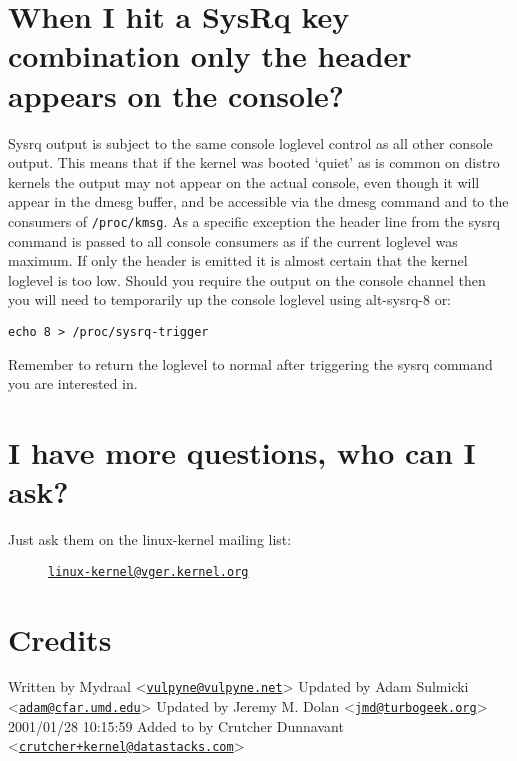 \documentclass[article,letterpaper]{memoir}
\let\subsection\section
\let\section\chapter
\begin{document}
\subsection{When I hit a SysRq key combination only the header appears
on the
console?}\label{when-i-hit-a-sysrq-key-combination-only-the-header-appears-on-the-console}

Sysrq output is subject to the same console loglevel control as all
other console output. This means that if the kernel was booted `quiet'
as is common on distro kernels the output may not appear on the actual
console, even though it will appear in the dmesg buffer, and be
accessible via the dmesg command and to the consumers of
\texttt{/proc/kmsg}. As a specific exception the header line from the
sysrq command is passed to all console consumers as if the current
loglevel was maximum. If only the header is emitted it is almost certain
that the kernel loglevel is too low. Should you require the output on
the console channel then you will need to temporarily up the console
loglevel using alt-sysrq-8 or:

\begin{verbatim}
echo 8 > /proc/sysrq-trigger
\end{verbatim}

Remember to return the loglevel to normal after triggering the sysrq
command you are interested in.

\subsection{I have more questions, who can I
ask?}\label{i-have-more-questions-who-can-i-ask}

\begin{description}
\item[Just ask them on the linux-kernel mailing list:]
\href{mailto:linux-kernel@vger.kernel.org}{\nolinkurl{linux-kernel@vger.kernel.org}}
\end{description}
\fi

\subsection{Credits}\label{credits}

Written by Mydraal
\textless{}\href{mailto:vulpyne@vulpyne.net}{\nolinkurl{vulpyne@vulpyne.net}}\textgreater{}
Updated by Adam Sulmicki
\textless{}\href{mailto:adam@cfar.umd.edu}{\nolinkurl{adam@cfar.umd.edu}}\textgreater{}
Updated by Jeremy M. Dolan
\textless{}\href{mailto:jmd@turbogeek.org}{\nolinkurl{jmd@turbogeek.org}}\textgreater{}
2001/01/28 10:15:59 Added to by Crutcher Dunnavant
\textless{}\href{mailto:crutcher+kernel@datastacks.com}{\nolinkurl{crutcher+kernel@datastacks.com}}\textgreater{}
\end{document}
